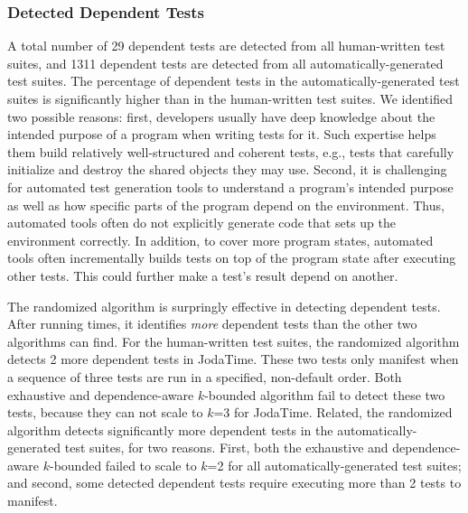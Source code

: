 \subsubsection{Detected Dependent Tests}
\label{sec:detectedtests}

A total number of 29 dependent tests are detected
from all human-written test suites, and 1311
dependent tests are detected from all automatically-generated
test suites. The percentage of dependent tests
in the automatically-generated test suites is significantly
higher than in the human-written test suites. We identified
two possible reasons: first, developers usually have deep
knowledge about the intended purpose of a program when writing tests
for it. Such expertise helps them build relatively well-structured and coherent
tests, e.g., tests that carefully initialize and destroy the
shared objects they may use. Second, 
 it is challenging for automated test generation tools to understand
 a program's intended purpose as well as how
specific parts of the program depend on the environment.
Thus, automated tools often do not explicitly generate code that sets up the
environment correctly.  In addition, to cover more
program states, automated tools often incrementally
builds tests on top of the program state after executing
other tests. This could further make a test's result depend on another.





The randomized algorithm is surpringly effective in
detecting dependent tests. After running \trialnum times,
it identifies \textit{more} dependent tests than the other
two algorithms can find. For the human-written
test suites, the randomized algorithm detects 2 more dependent
tests in JodaTime. These two tests only
manifest when a sequence of three tests are run in a specified,
non-default order. Both exhaustive and dependence-aware $k$-bounded
algorithm fail to detect these two tests, because
they can not scale to $k$=3 for 
JodaTime. Related, the randomized algorithm
detects significantly more dependent
tests in the automatically-generated test suites, for
two reasons. First,
both the exhaustive and dependence-aware $k$-bounded
failed to scale to $k$=2 for all automatically-generated test suites;
and second, some detected dependent tests require executing more than 2 tests
to manifest.


